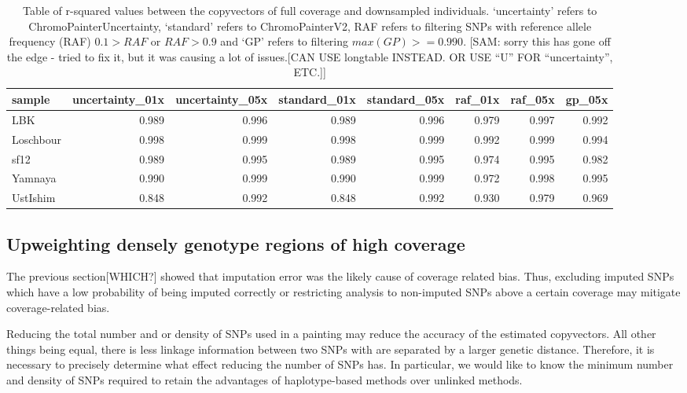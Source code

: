 \begin{table}
\centering
\begin{tabular}[t]{lrrrrrrr}
\toprule
sample & uncertainty\_01x & uncertainty\_05x & standard\_01x & standard\_05x & raf\_01x & raf\_05x & gp\_05x\\
\midrule
LBK & 0.989 & 0.996 & 0.989 & 0.996 & 0.979 & 0.997 & 0.992\\
Loschbour & 0.998 & 0.999 & 0.998 & 0.999 & 0.992 & 0.999 & 0.994\\
sf12 & 0.989 & 0.995 & 0.989 & 0.995 & 0.974 & 0.995 & 0.982\\
Yamnaya & 0.990 & 0.999 & 0.990 & 0.999 & 0.972 & 0.998 & 0.995\\
UstIshim & 0.848 & 0.992 & 0.848 & 0.992 & 0.930 & 0.979 & 0.969\\
\bottomrule
\end{tabular}
\caption{Table of r-squared values between the copyvectors of full coverage and downsampled individuals. `uncertainty' refers to ChromoPainterUncertainty, `standard' refers to ChromoPainterV2, RAF refers to filtering SNPs with reference allele frequency (RAF) $0.1 > RAF$ or $RAF > 0.9$ and `GP' refers to filtering $max(GP) >= 0.990$. [SAM: sorry this has gone off the edge - tried to fix it, but it was causing a lot of issues.{\color{red}[CAN USE longtable INSTEAD. OR USE ``U'' FOR ``uncertainty'', ETC.]}]}
\end{table}



\subsection{Upweighting densely genotype regions of high coverage}

The previous section{\color{red}[WHICH?]} showed that imputation error was the likely cause of coverage related bias. Thus, excluding imputed SNPs which have a low probability of being imputed correctly or restricting analysis to non-imputed SNPs above a certain coverage may mitigate coverage-related bias.

Reducing the total number and or density of SNPs used in a painting may reduce the accuracy of the estimated copyvectors. All other things being equal, there is less linkage information between two SNPs with are separated by a larger genetic distance. Therefore, it is necessary to precisely determine what effect reducing the number of SNPs has. In particular, we would like to know the minimum number and density of SNPs required to retain the advantages of haplotype-based methods over unlinked methods. 

